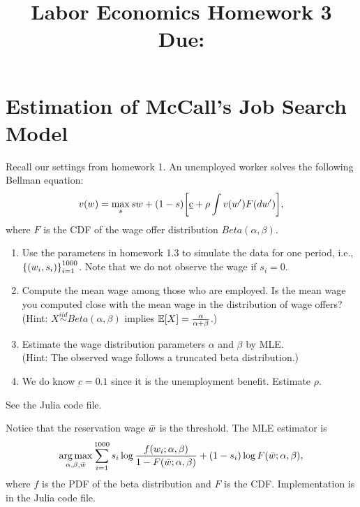 \documentclass[12pt]{article}
\title{
    Labor Economics Homework 3 \\
    \large Due: \\
    }
\author{}
\date{}
\begin{document}

\maketitle
\vspace{-2cm}

\section{Estimation of McCall's Job Search Model} 
Recall our settings from homework 1. An unemployed worker solves the 
following Bellman equation:
\begin{equation*}
    v(w) = \max_{s} sw + (1-s)\sbrc{\underbar{c} + \rho \int v(w') F(dw')},
\end{equation*}
where $F$ is the CDF of the wage offer distribution $Beta(\alpha, \beta)$.
\begin{enumerate}
    \item Use the parameters in homework 1.3 to simulate the data 
    for one period, i.e., $\left\{ {(w_i, s_i)} \right\}_{i=1}^{1000}$. 
    Note that we do not observe the wage if $s_i = 0$.
    \item Compute the mean wage among those who are employed. Is the mean wage you computed
    close with the mean wage in the distribution of wage offers? \\
    (Hint: $X\overset{iid}{\sim}Beta(\alpha, \beta)$ implies $\Ex{X} = \frac{\alpha}{\alpha + \beta}$.)
    \item Estimate the wage distribution parameters $\alpha$ and $\beta$ by MLE. \\
    (Hint: The observed wage follows a truncated beta distribution.) 
    \item We do know $\underbar{c} = 0.1$ since it is the unemployment benefit. 
    Estimate $\rho$.
\end{enumerate}

\begin{sol}[1.1, 1.2, 1.4]
    See the Julia code file.
\end{sol} 

\begin{sol}[1.3]
    Notice that the reservation wage $\Bar{w}$ is the threshold. The MLE estimator is 
    \begin{equation*}
        \operatorname*{arg\,max}_{\alpha, \beta, \Bar{w}} \sum_{i=1}^{1000} s_i\log \frac{f(w_i;\alpha, \beta)}{1 - F(\Bar{w};\alpha, \beta)} + (1-s_i)\log F(\Bar{w};\alpha, \beta),
    \end{equation*}
    where $f$ is the PDF of the beta distribution and $F$ is the CDF. Implementation is in the Julia code file.
\end{sol}
\end{document}
